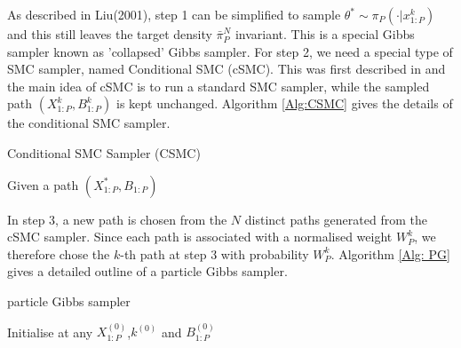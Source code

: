 \documentclass[12pt,a4paper]{article}
\begin{document}
As described in Liu(2001), step 1 can be simplified to sample $\theta^{*} \sim \pi_P(\cdot|x_{1:P}^k)$ and this still leaves the target density $\bar{\pi}_P^N$ invariant. This is a special Gibbs sampler known as 'collapsed' Gibbs sampler. For step 2, we need a special type of SMC sampler, named Conditional SMC (cSMC). This was first described in \cite{andrieu2010particle} and the main idea of cSMC is to run a standard SMC sampler, while the sampled path $\left(X_{1:P}^k,B_{1:P}^k\right)$ is kept unchanged. Algorithm \ref{Alg:CSMC} gives the details of the conditional SMC sampler. 

\begin{algorithm}[htb!]
    \caption{Conditional SMC Sampler (CSMC)}\label{Alg:CSMC}
    Given a path $\left(X_{1:P}^{*},B_{1:P}\right)$\;
    
\end{algorithm}
In step 3, a new path is chosen from the $N$ distinct paths generated from the cSMC sampler. Since each path is associated with a normalised weight $W_P^k$, we therefore chose the $k$-th path at step 3 with probability $W_P^k$. Algorithm \ref{Alg: PG} gives a detailed outline of a particle Gibbs sampler. 
\begin{algorithm}[htb!]
    \caption{particle Gibbs sampler}\label{Alg: PG}
        Initialise at any $X_{1:P}^{(0)}$,$k^{(0)}$ and $B_{1:P}^{(0)}$\;
\end{algorithm}
\end{document}
